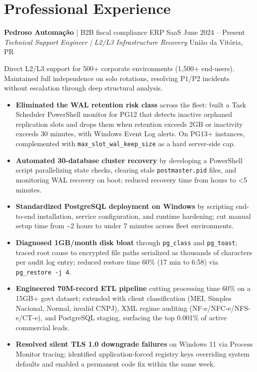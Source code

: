 \documentclass[11pt,letterpaper]{article}
\begin{document}
\section{Professional Experience}

\textbf{Pedroso Automação} | B2B fiscal compliance ERP SaaS \hfill June 2024 -- Present \\
\textit{Technical Support Engineer | L2/L3 Infrastructure Recovery} \hfill União da Vitória, PR

Direct L2/L3 support for 500+ corporate environments (1,500+ end-users). Maintained full independence on solo rotations, resolving P1/P2 incidents without escalation through deep structural analysis.
\begin{itemize}[topsep=4pt]
    \item \textbf{Eliminated the WAL retention risk class} across the fleet: built a Task Scheduler PowerShell monitor for PG12 that detects inactive orphaned replication slots and drops them when retention exceeds 2GB or inactivity exceeds 30 minutes, with Windows Event Log alerts. On PG13+ instances, complemented with \texttt{max\_slot\_wal\_keep\_size} as a hard server-side cap.
    \item \textbf{Automated 30-database cluster recovery} by developing a PowerShell script parallelizing state checks, clearing stale \texttt{postmaster.pid} files, and monitoring WAL recovery on boot; reduced recovery time from hours to <5 minutes.
    \item \textbf{Standardized PostgreSQL deployment on Windows} by scripting end-to-end installation, service configuration, and runtime hardening; cut manual setup time from \textasciitilde{}2 hours to under 7 minutes across fleet environments.
    \item \textbf{Diagnosed 1GB/month disk bloat} through \texttt{pg\_class} and \texttt{pg\_toast}; traced root cause to encrypted file paths serialized as thousands of characters per audit log entry; reduced restore time 60\% (17 min to 6:58) via \texttt{pg\_restore -j 4}.
    \item \textbf{Engineered 70M-record ETL pipeline} cutting processing time 60\% on a 15GB+ govt dataset; extended with client classification (MEI, Simples Nacional, Normal, invalid CNPJ), XML regime auditing (NF-e/NFC-e/NFS-e/CT-e), and PostgreSQL staging, surfacing the top 0.001\% of active commercial leads.
    \item \textbf{Resolved silent TLS 1.0 downgrade failures} on Windows 11 via Process Monitor tracing; identified application-forced registry keys overriding system defaults and enabled a permanent code fix within the same week.

\end{itemize}
\end{document}
